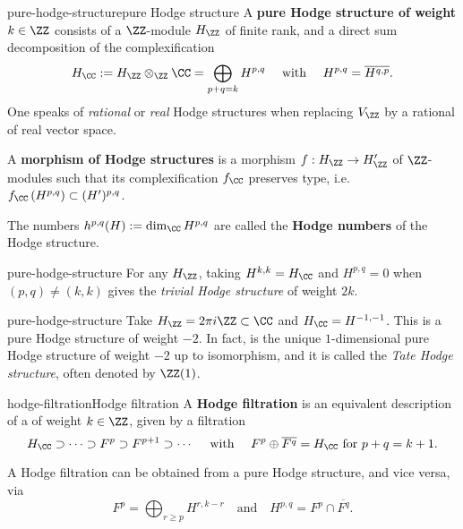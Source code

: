 \begin{topic}{pure-hodge-structure}{pure Hodge structure}
    A \textbf{pure Hodge structure of weight $k \in \ZZ$} consists of a $\ZZ$-module $H_\ZZ$ of finite rank, and a direct sum decomposition of the complexification
    \[ H_\CC := H_\ZZ \otimes_\ZZ \CC = \bigoplus_{p + q = k} H^{p, q} \quad \text{ with } \quad H^{p, q} = \overline{H^{q, p}} . \]
    One speaks of \textit{rational} or \textit{real} Hodge structures when replacing $V_\ZZ$ by a rational of real vector space.
    
    A \textbf{morphism of Hodge structures} is a morphism $f : H_\ZZ \to H'_\ZZ$ of $\ZZ$-modules such that its complexification $f_\CC$ preserves type, i.e. $f_\CC\left(H^{p, q}\right) \subset (H')^{p, q}$.
    
    The numbers $h^{p, q}(H) := \dim_\CC H^{p, q}$ are called the \textbf{Hodge numbers} of the Hodge structure.
\end{topic}

\begin{example}{pure-hodge-structure}
    For any $H_\ZZ$, taking $H^{k,k} = H_\CC$ and $H^{p, q} = 0$ when $(p, q) \ne (k, k)$ gives the \textit{trivial Hodge structure} of weight $2k$.
\end{example}

\begin{example}{pure-hodge-structure}
    Take $H_\ZZ = 2 \pi i \ZZ \subset \CC$ and $H_\CC = H^{-1, -1}$. This is a pure Hodge structure of weight $-2$. In fact, is the unique $1$-dimensional pure Hodge structure of weight $-2$ up to isomorphism, and it is called the \textit{Tate Hodge structure}, often denoted by $\ZZ(1)$.
\end{example}

\begin{topic}{hodge-filtration}{Hodge filtration}
    A \textbf{Hodge filtration} is an equivalent description of a  of weight $k \in \ZZ$, given by a filtration
    \[ H_\CC \supset \cdots \supset F^p \supset F^{p + 1} \supset \cdots \quad \text{ with } \quad F^p \oplus \overline{F^q} = H_\CC \text{ for } p + q = k + 1 . \]
    
    A Hodge filtration can be obtained from a pure Hodge structure, and vice versa, via
    \[ F^p = \bigoplus_{r \ge p} H^{r, k - r} \quad \text{and} \quad H^{p, q} = F^p \cap \overline{F^q} . \]
\end{topic}

